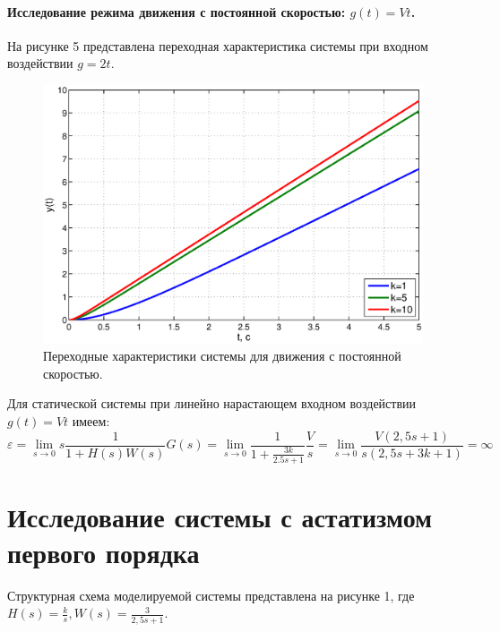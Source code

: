 \documentclass[12pt,a4paper]{article}
\begin{document}
\paragraph*{Исследование режима движения с постоянной скоростью: $g(t)=Vt$.} 
На рисунке 5 представлена переходная характеристика системы при входном воздействии $g=2t$.
\begin{figure}[H]
	\centering
	\includegraphics[width=1\linewidth]{1.2.eps}
	\caption{Переходные характеристики системы для движения с постоянной скоростью.}
\end{figure}
Для статической системы при линейно нарастающем входном воздействии $g(t)=Vt$ имеем:
\begin{equation}
    \varepsilon = \lim_{s\to0} s\frac{1}{1+H(s)W(s)}G(s) = \lim_{s\to0} \frac{1}{1+\displaystyle{\frac{3k}{2.5s+1}}}\frac{V}{s} = \lim_{s\to0} \frac{V(2,5s+1)}{s(2,5s+3k+1)} = \infty
\end{equation}

\newpage
\section*{Исследование системы с астатизмом первого порядка}
Структурная схема моделируемой системы представлена на рисунке 1, где $H(s) = \displaystyle{\frac{k}{s}}, W(s)=\displaystyle{\frac{3}{2,5s + 1}}$.
\end{document}
